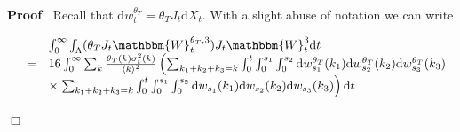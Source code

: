 \documentclass[11pt]{article}
\newcommand{\mathd}{\mathrm{d}}
\newenvironment{proof}{\noindent\textbf{Proof\ }}{\hspace*{\fill}$\Box$\medskip}
\begin{document}
\begin{proof}
  Recall that $\mathd w_t^{\theta_T} = \theta_T J_t \mathd X_t$. With a slight
  abuse of notation we can write
  
  \[ \begin{array}{lll}
       &  & \int^{\infty}_0 \int_{\Lambda} (\theta_T J_t
       \mathbbm{W}_t^{\theta_T, 3}) J_t \mathbbm{W}_t^3 \mathd t\\
       & = & 16 \int^{\infty}_0 \sum_k \frac{\theta_T (k) \sigma^2_t
       (k)}{\langle k \rangle^2} \left( \sum_{k_1 + k_2 + k_3 = k} \int^t_0
       \int^{s_1}_0 \int^{s_2}_0 \mathd w_{s_1}^{\theta_T} (k_1) \mathd
       w_{s_2}^{\theta_T} (k_2) \mathd w^{\theta_T}_{s_3} (k_3) \right.\\
       &  & \times \left. \sum_{k_1 + k_2 + k_3 = k} \int^t_0 \int^{s_1}_0
       \int^{s_2}_0 \mathd w_{s_1} (k_1) \mathd w_{s_2} (k_2) \mathd w_{s_3}
       (k_3)  \right) \mathd t
     \end{array}  \]
  

\end{proof}
\end{document}
